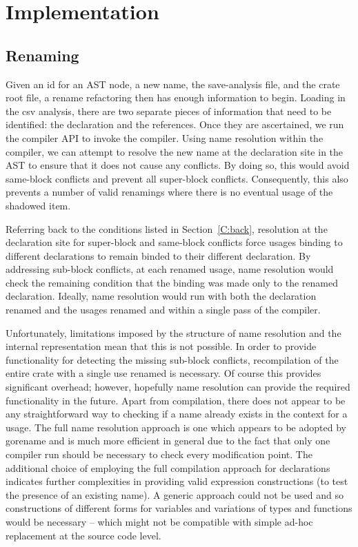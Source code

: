 \section{Implementation}\label{C:impl}

\subsection{Renaming}

Given an id for an AST node, a new name, the save-analysis file, and the crate root file, a rename refactoring then has enough information to begin. Loading in the csv analysis, there are two separate pieces of information that need to be identified: the declaration and the references. Once they are ascertained, we run the compiler API to invoke the compiler. Using name resolution within the compiler, we can attempt to resolve the new name at the declaration site in the AST to ensure that it does not cause any conflicts. By doing so, this would avoid same-block conflicts and prevent all super-block conflicts. Consequently, this also prevents a number of valid renamings where there is no eventual usage of the shadowed item.

Referring back to the conditions listed in Section~\ref{C:back}, resolution at the declaration site for super-block and same-block conflicts force usages binding to different declarations to remain binded to their different declaration. By addressing sub-block conflicts, at each renamed usage, name resolution would check the remaining condition that the binding was made only to the renamed declaration. Ideally, name resolution would run with both the declaration renamed and the usages renamed and within a single pass of the compiler.

Unfortunately, limitations imposed by the structure of name resolution and the internal representation mean that this is not possible. In order to provide functionality for detecting the missing sub-block conflicts, recompilation of the entire crate with a single use renamed is necessary. Of course this provides significant overhead; however, hopefully name resolution can provide the required functionality in the future. Apart from compilation, there does not appear to be any straightforward way to checking if a name already exists in the context for a usage. The full name resolution approach is one which appears to be adopted by gorename \cite{gorename15} and is much more efficient in general due to the fact that only one compiler run should be necessary to check every modification point. The additional choice of employing the full compilation approach for declarations indicates further complexities in providing valid expression constructions (to test the presence of an existing name). A generic approach could not be used and so constructions of different forms for variables and variations of types and functions would be necessary -- which might not be compatible with simple ad-hoc replacement at the source code level.

